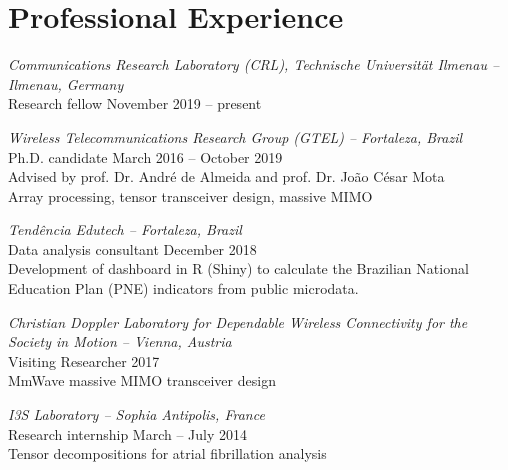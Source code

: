 \section{Professional Experience}

{\sl Communications Research Laboratory (CRL), Technische Universit\"at Ilmenau -- Ilmenau, Germany} \\
Research fellow \hfill November 2019 -- present


{\sl Wireless Telecommunications Research Group (GTEL) -- Fortaleza, Brazil}\\
Ph.D. candidate \hfill March 2016 -- October 2019 \\
Advised by prof. Dr. Andr\'e de Almeida and prof. Dr. Jo\~ao C\'esar Mota\\
Array processing, tensor transceiver design, massive MIMO

{\sl Tendência Edutech -- Fortaleza, Brazil}\\
Data analysis consultant \hfill December 2018 \\
Development of dashboard in R (Shiny) to calculate the Brazilian National Education Plan (PNE) indicators from public microdata.

{\sl Christian Doppler Laboratory for Dependable Wireless Connectivity for the Society in Motion -- Vienna, Austria}\\
Visiting Researcher \hfill 2017 \\
MmWave massive MIMO transceiver design

{\sl I3S Laboratory -- Sophia Antipolis, France}\\
Research internship \hfill  March -- July 2014 \\
Tensor decompositions for atrial fibrillation analysis